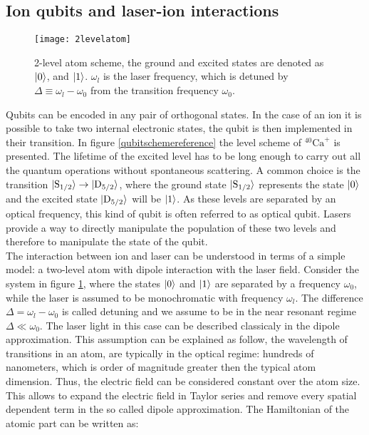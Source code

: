 \subsection{Ion qubits and laser-ion interactions}
\label{laserioninteractions}
\begin{figure}
\centering
\texttt{[image: 2levelatom]}
\caption{2-level atom scheme, the ground and excited states are denoted as $\ket{0}$, and $\ket{1}$. $\omega_l$ is the laser frequency, which is detuned by $\Delta \equiv \omega_l - \omega_0$ from the transition frequency $\omega_0$.}
\label{2levelatom}
\end{figure}
Qubits can be encoded in any pair of orthogonal states. In the case of an ion it is possible to take two internal electronic states, the qubit is then implemented in their transition. In figure \ref{qubitschemereference} the level scheme of $^{40}\text{Ca}^+$ is presented. The lifetime of the excited level has to be long enough to carry out all the quantum operations without spontaneous scattering. A common choice is the transition $\ket{\text{S}_{1/2}} \to \ket{\text{D}_{5/2}}$, where the ground state $\ket{\text{S}_{1/2}}$ represents the state $\ket{0}$ and the excited state $\ket{\text{D}_{5/2}}$ will be $\ket{1}$. As these levels are separated by an optical frequency, this kind of qubit is often referred to as optical qubit. Lasers provide a way to directly manipulate the population of these two levels and therefore to manipulate the state of the qubit.\\
The interaction between ion and laser can be understood in terms of a simple model: a two-level atom with dipole interaction with the laser field. Consider the system in figure \ref{2levelatom}, where the states $\ket{0}$ and $\ket{1}$ are separated by a frequency $\omega_0$, while the laser is assumed to be monochromatic with frequency $\omega_l$. The difference $\Delta = \omega_l -\omega_0$ is called detuning and we assume to be in the near resonant regime $\Delta \ll \omega_0$. The laser light in this case can be described classicaly in the dipole approximation.
This assumption can be explained as follow, the wavelength of transitions in an atom, are typically in the optical regime: hundreds of nanometers, which is order of magnitude greater then the typical atom dimension. Thus, the electric field can be considered constant over the atom size. This allows to expand the electric field in Taylor series and remove every spatial dependent term in the so called dipole approximation.
The Hamiltonian of the atomic part can be written as:
